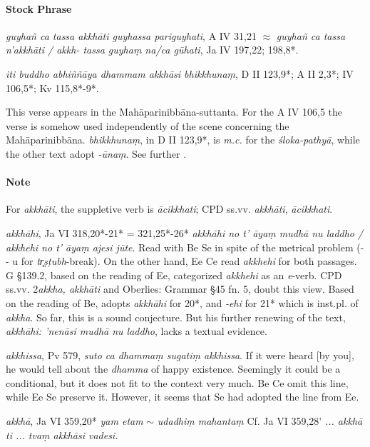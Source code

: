 \documentclass[11pt]{article}
\newcommand*\ṛ{r\symbol{"325}}
\newcommand*\Ṛ{R\symbol{"325}}
\newcommand*\ṝ{r\symbol{"304}\symbol{"325}}
\newcommand*\Ṝ{R\symbol{"304}\symbol{"325}}
\newcommand*\ḷ{l\symbol{"325}}
\newcommand*\ḹ{l\symbol{"304}\symbol{"325}}
\newcommand*\Ḷ{L\symbol{"325}}
\newcommand*\Ḹ{L\symbol{"304}\symbol{"325}}
\begin{document}
\paragraph*{Stock Phrase}
\textit{guyhañ ca tassa akkhāti guyhassa pariguyhati},
A IV 31,21 $\approx$
\textit{guyhañ ca tassa n'akkhāti / akkh- tassa guyhaṃ na/ca gūhati},
Ja IV 197,22; 198,8*.

\textit{iti buddho abhiññāya dhammam akkhāsi bhikkhunaṃ},
D II 123,9*; A II 2,3*; IV 106,5*; Kv 115,8*-9*.

This verse appears in the Mahāparinibbāna-suttanta.
For the A IV 106,5 the verse is somehow used independently of the scene concerning the Mahāparinibbāna.
\textit{bhikkhunaṃ}, in D II 123,9*, is \textit{m.c.} for the \textit{śloka-pathyā},
while the other text adopt \textit{-ūnaṃ}.
See further \citet[320]{Franke:1909}.

\paragraph{Note}
For \textit{akkhāti}, the suppletive verb is \textit{ācikkhati}; CPD ss.vv. \textit{akkhāti}, \textit{ācik\-kha\-ti}.


\textit{akkhāhi}, Ja VI 318,20*-21* = 321,25*-26* \textit{akkhāhi no t' āyaṃ mudhā nu laddho / akkhehi no t' āyaṃ ajesi jūte}.
Read with Be Se in spite of the metrical problem (- - u for \textit{tr̥ṣṭubh}-break).
On the other hand, Ee Ce read \textit{akkhehi} for both passages.
G \S 139.2, based on the reading of Ee, categorized \textit{akkhehi} as an \textit{e}-verb.
CPD ss.vv. 2\textit{akkha, akkhāti} and Oberlies: Grammar \S 45 fn. 5, doubt this view.
Based on the reading of Be, \citet[50-51]{alsdorf:1971} adopts \textit{akkhāhi} for 20*, and \textit{-ehi} for 21* which is inst.pl. of \textit{akkha}.
So far, this is a sound conjecture.
But his further renewing of the text, \textit{akkhāhi: 'nenāsi mudhā nu laddho}, lacks a textual evidence.

\textit{akkhissa}, Pv 579,
\textit{suto ca dhammaṃ sugatiṃ akkhissa}.
If it were heard [by you], he would tell about the \textit{dhamma} of happy existence.
Seemingly it could be a conditional, but it does not fit to the context very much.
Be Ce omit this line, while Ee Se preserve it.
However, it seems that Se had adopted the line from Ee.

\textit{akkhā}, Ja VI 359,20* \textit{yam etam} $\sim$ \textit{udadhiṃ mahantaṃ}
Cf. Ja VI 359,28' \textit{... akkhā ti ... tvaṃ akkhāsi vadesi.}
\end{document}
